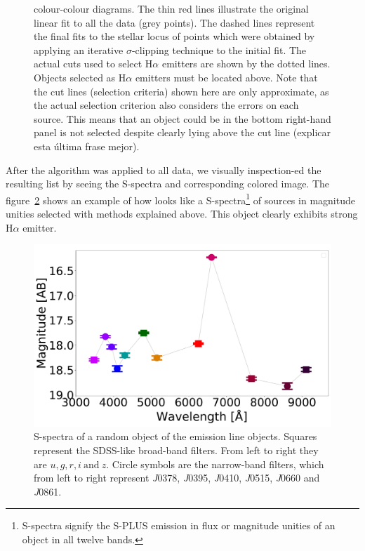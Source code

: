 \documentclass[fleqn,usenatbib]{mnras}
\begin{document}
\begin{figure}
{    colour-colour diagrams. The thin red lines illustrate the original linear
    fit to all the data (grey points). The dashed lines represent the final
    fits to the stellar locus of points which were obtained by applying an iterative
    $\sigma$-clipping technique to the initial fit. The actual cuts used to select
    H{$\alpha$} emitters are shown by the dotted lines. Objects selected as H{$\alpha$}
    emitters must be located above. Note that the cut lines (selection criteria) shown
    here are only approximate, as the actual selection criterion also considers the
    errors on each source. This means that an object could be in the bottom
    right-hand panel is not selected despite clearly lying above the cut line
    ({\sc explicar esta última frase mejor}).}
  \label{fig:criteria-color-plot}
\end{figure}

After the algorithm was applied to all data, we visually inspection-ed the
resulting list by seeing the S-spectra and corresponding colored image.
The figure~\ref{fig:Spectra} shows an example of how looks like a
S-spectra\footnote{S-spectra signify the S-PLUS emission in flux
or magnitude unities of an object in all twelve bands.} of sources in
magnitude unities selected with methods explained above. This object
clearly exhibits strong H$\alpha$ emitter.

\begin{figure}
\includegraphics[width=0.9\linewidth]{Figs/photopectrum_splus_HYDRA-0026-052331_Good-LD-Halpha-DR3_noFlag_merge-takeoutbad-Final_PStotal.pdf}
\centering
{}
\caption{S-spectra of a random object of the emission line objects. Squares represent
  the SDSS-like broad-band filters. From left to right they are \(u, g, r,
  i~\text{and}~ z\). Circle symbols are the narrow-band filters, which from
  left to right represent \textit{J}0378, \textit{J}0395, \textit{J}0410,
  \textit{J}0515, \textit{J}0660 and \textit{J}0861.}
\label{fig:Spectra}
\end{figure}
\end{document}
